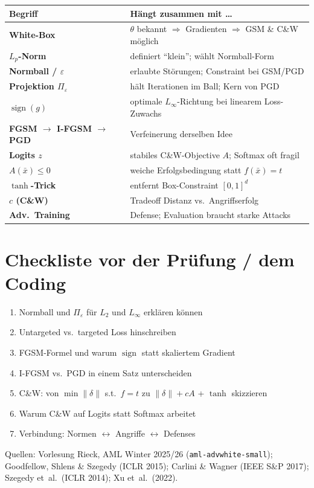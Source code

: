 \documentclass[11pt,a4paper]{article}
\newcommand{\eps}{\varepsilon}
\begin{document}
\begin{center}
\renewcommand{\arraystretch}{1.18}
\begin{tabularx}{\textwidth}{@{}>{\bfseries}p{3.1cm} X@{}}
\toprule
Begriff & Hängt zusammen mit \ldots \\
\midrule
White-Box & $\theta$ bekannt $\Rightarrow$ Gradienten $\Rightarrow$ GSM \& C\&W möglich \\
$L_p$-Norm & definiert ``klein''; wählt Normball-Form \\
Normball / $\eps$ & erlaubte Störungen; Constraint bei GSM/PGD \\
Projektion $\Pi_\eps$ & hält Iterationen im Ball; Kern von PGD \\
$\operatorname{sign}(g)$ & optimale $L_\infty$-Richtung bei linearem Loss-Zuwachs \\
FGSM $\to$ I-FGSM $\to$ PGD & Verfeinerung derselben Idee \\
Logits $z$ & stabiles C\&W-Objective $A$; Softmax oft fragil \\
$A(\bar x)\le 0$ & weiche Erfolgsbedingung statt $f(\bar x)=t$ \\
$\tanh$-Trick & entfernt Box-Constraint $[0,1]^d$ \\
$c$ (C\&W) & Tradeoff Distanz vs.\ Angriffserfolg \\
Adv.\ Training & Defense; Evaluation braucht starke Attacks \\
\bottomrule
\end{tabularx}
\end{center}

\section{Checkliste vor der Prüfung / dem Coding}

\begin{enumerate}
  \item Normball und $\Pi_\eps$ für $L_2$ und $L_\infty$ erklären können
  \item Untargeted vs.\ targeted Loss hinschreiben
  \item FGSM-Formel und warum $\operatorname{sign}$ statt skaliertem Gradient
  \item I-FGSM vs.\ PGD in einem Satz unterscheiden
  \item C\&W: von $\min\|\delta\|$ s.t.\ $f=t$ zu $\|\delta\|+cA$ + $\tanh$ skizzieren
  \item Warum C\&W auf Logits statt Softmax arbeitet
  \item Verbindung: Normen $\leftrightarrow$ Angriffe $\leftrightarrow$ Defenses
\end{enumerate}

\vspace{0.5em}
{\footnotesize\color{black!55}
Quellen: Vorlesung Rieck, AML Winter 2025/26 (\texttt{aml-advwhite-small});
Goodfellow, Shlens \& Szegedy (ICLR 2015);
Carlini \& Wagner (IEEE S\&P 2017);
Szegedy et~al.\ (ICLR 2014); Xu et~al.\ (2022).
}
\end{document}
